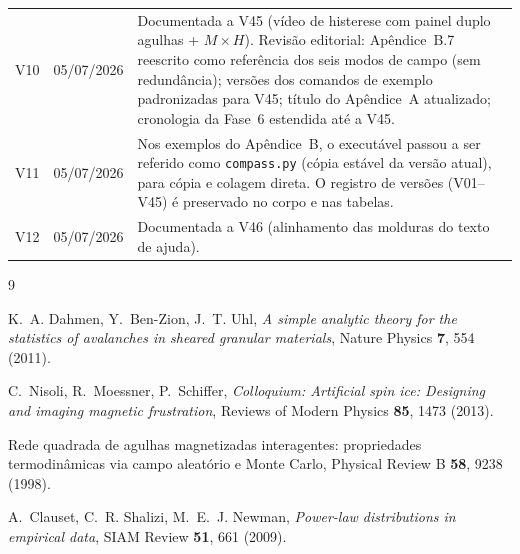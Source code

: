 \documentclass[11pt,a4paper]{article}
\newcommand{\code}[1]{\texttt{#1}}
\begin{document}
\begin{tabular}{@{}lll@{}}
V10 & 05/07/2026 & Documentada a V45 (vídeo de histerese com painel
duplo agulhas + $M\times H$). Revisão editorial: Apêndice~B.7
reescrito como referência dos seis modos de campo (sem redundância);
versões dos comandos de exemplo padronizadas para V45; título do
Apêndice~A atualizado; cronologia da Fase~6 estendida até a V45. \\
V11 & 05/07/2026 & Nos exemplos do Apêndice~B, o executável passou a ser
referido como \code{compass.py} (cópia estável da versão atual), para
cópia e colagem direta. O registro de versões (V01--V45) é preservado
no corpo e nas tabelas. \\
V12 & 05/07/2026 & Documentada a V46 (alinhamento das molduras do texto
de ajuda). \\
\bottomrule
\end{tabular}

\begin{thebibliography}{9}

K.~A. Dahmen, Y.~Ben-Zion, J.~T. Uhl,
\emph{A simple analytic theory for the statistics of avalanches in
sheared granular materials},
Nature Physics \textbf{7}, 554 (2011).

C.~Nisoli, R.~Moessner, P.~Schiffer,
\emph{Colloquium: Artificial spin ice: Designing and imaging magnetic
frustration},
Reviews of Modern Physics \textbf{85}, 1473 (2013).

Rede quadrada de agulhas magnetizadas interagentes: propriedades
termodinâmicas via campo aleatório e Monte Carlo,
Physical Review B \textbf{58}, 9238 (1998).

A.~Clauset, C.~R. Shalizi, M.~E.~J. Newman,
\emph{Power-law distributions in empirical data},
SIAM Review \textbf{51}, 661 (2009).

\end{thebibliography}
\end{document}
